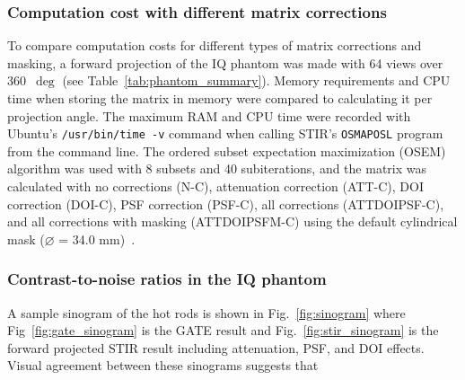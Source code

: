 \documentclass[utf8]{FrontiersinHarvard} %
\begin{document}
\subsubsection{Computation cost with different matrix corrections}

To compare computation costs for different types of matrix corrections and masking, a forward projection of the IQ phantom was made with 64 views over 360~$\deg$ (see Table~\ref{tab:phantom_summary}). Memory requirements and CPU time when storing the matrix in memory were compared to calculating it per projection angle. The maximum RAM and CPU time were recorded with Ubuntu's \texttt{/usr/bin/time -v} command when calling STIR's \texttt{OSMAPOSL} program from the command line. The ordered subset expectation maximization (OSEM) algorithm was used with 8 subsets and 40 subiterations, and the matrix was calculated with no corrections (N-C), attenuation correction (ATT-C), DOI correction (DOI-C), PSF correction (PSF-C), all corrections (ATTDOIPSF-C), and all corrections with masking (ATTDOIPSFM-C) using the default cylindrical mask ($\diameter$ = 34.0 mm)~\cite{osem}.

\subsubsection{Contrast-to-noise ratios in the IQ phantom}

A sample sinogram of the hot rods is shown in Fig.~\ref{fig:sinogram} where Fig~\ref{fig:gate_sinogram} is the GATE result and Fig.~\ref{fig:stir_sinogram} is the forward projected STIR result including attenuation, PSF, and DOI effects. Visual agreement between these sinograms suggests that 
\end{document}
